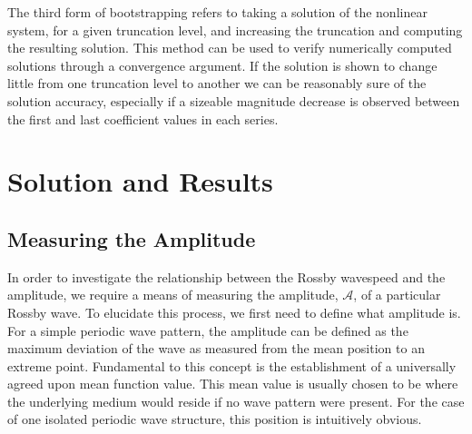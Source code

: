 The third form of bootstrapping refers to taking a solution of the nonlinear system, for a given truncation level, and increasing the truncation and computing the resulting solution. This method can be used to verify numerically computed solutions through a convergence argument. If the solution is shown to change little from one truncation level to another we can be reasonably sure of the solution accuracy, especially if a sizeable magnitude decrease is observed between the first and last coefficient values in each series.

\section{Solution and Results}
\subsection{Measuring the Amplitude}
\label{subsec:ampmeas}
In order to investigate the relationship between the Rossby wavespeed and the amplitude, we require a means of measuring the amplitude, $\mathcal{A}$, of a particular Rossby wave. To elucidate this process, we first need to define what amplitude is. For a simple periodic wave pattern, the amplitude can be defined as the maximum deviation of the wave as measured from the mean position to an extreme point. Fundamental to this concept is the establishment of a universally agreed upon mean function value. This mean value is usually chosen to be where the underlying medium would reside if no wave pattern were present. For the case of one isolated periodic wave structure, this position is intuitively obvious.

